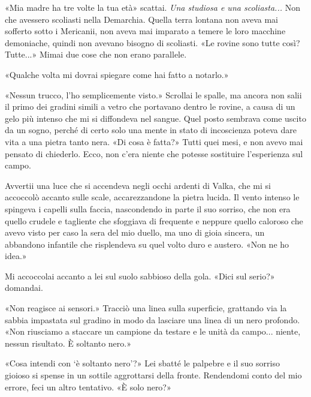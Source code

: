 «Mia madre ha tre volte la tua età» scattai. \emph{Una studiosa e una
	scoliasta...} Non che avessero scoliasti nella Demarchia. Quella terra
lontana non aveva mai sofferto sotto i Mericanii, non aveva mai imparato
a temere le loro macchine demoniache, quindi non avevano bisogno di
scoliasti. «Le rovine sono tutte così? Tutte...» Mimai due cose che non
erano parallele.

«Qualche volta mi dovrai spiegare come hai fatto a notarlo.»

«Nessun trucco, l'ho semplicemente visto.» Scrollai le spalle, ma ancora
non salii il primo dei gradini simili a vetro che portavano dentro le
rovine, a causa di un gelo più intenso che mi si diffondeva nel sangue.
Quel posto sembrava come uscito da un sogno, perché di certo solo una
mente in stato di incoscienza poteva dare vita a una pietra tanto nera.
«Di cosa è fatta?» Tutti quei mesi, e non avevo mai pensato di
chiederlo. Ecco, non c'era niente che potesse sostituire l'esperienza
sul campo.

Avvertii una luce che si accendeva negli occhi ardenti di Valka, che mi
si accoccolò accanto sulle scale, accarezzandone la pietra lucida. Il
vento intenso le spingeva i capelli sulla faccia, nascondendo in parte
il suo sorriso, che non era quello crudele e tagliente che sfoggiava di
frequente e neppure quello caloroso che avevo visto per caso la sera del
mio duello, ma uno di gioia sincera, un abbandono infantile che
risplendeva su quel volto duro e austero. «Non ne ho idea.»

Mi accoccolai accanto a lei sul suolo sabbioso della gola. «Dici sul
serio?» domandai.

«Non reagisce ai sensori.» Tracciò una linea sulla superficie, grattando
via la sabbia impastata sul gradino in modo da lasciare una linea di un
nero profondo. «Non riusciamo a staccare un campione da testare e le
unità da campo... niente, nessun risultato. È soltanto nero.»

«Cosa intendi con `è soltanto nero'?» Lei sbatté le palpebre e il suo
sorriso gioioso si spense in un sottile aggrottarsi della fronte.
Rendendomi conto del mio errore, feci un altro tentativo. «È solo nero?»

